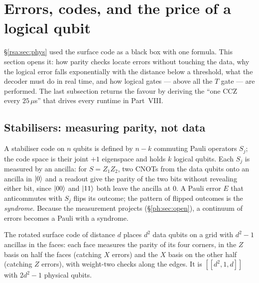 \section{Errors, codes, and the price of a logical qubit}\label{ph:sec:codes}

\S\ref{rsa:sec:phys} used the surface code as a black box with one formula. This section opens
it: how parity checks locate errors without touching the data, why the logical error falls
exponentially with the distance below a threshold, what the decoder must do in real time, and
how logical gates --- above all the $T$ gate --- are performed. The last subsection returns the
favour by deriving the ``one CCZ every $25\,\mu$s'' that drives every runtime in Part~VIII.

\subsection{Stabilisers: measuring parity, not data}

A stabiliser code on $n$ qubits is defined by $n-k$ commuting Pauli operators $S_j$; the code
space is their joint $+1$ eigenspace and holds $k$ logical qubits. Each $S_j$ is measured by an
ancilla: for $S=Z_1Z_2$, two CNOTs from the data qubits onto an ancilla in $\lvert 0 \rangle$ and a readout
give the parity of the two bits without revealing either bit, since $\lvert 00 \rangle$ and $\lvert 11 \rangle$ both
leave the ancilla at $0$. A Pauli error $E$ that anticommutes with $S_j$ flips its outcome; the
pattern of flipped outcomes is the \emph{syndrome}. Because the measurement projects
(\S\ref{ph:sec:open}), a continuum of errors becomes a Pauli with a syndrome.

The rotated surface code of distance $d$ places $d^2$ data qubits on a grid with $d^2-1$ ancillas
in the faces: each face measures the parity of its four corners, in the $Z$ basis on half the
faces (catching $X$ errors) and the $X$ basis on the other half (catching $Z$ errors), with
weight-two checks along the edges. It is $[[d^2,1,d]]$ with $2d^2-1$ physical qubits.

